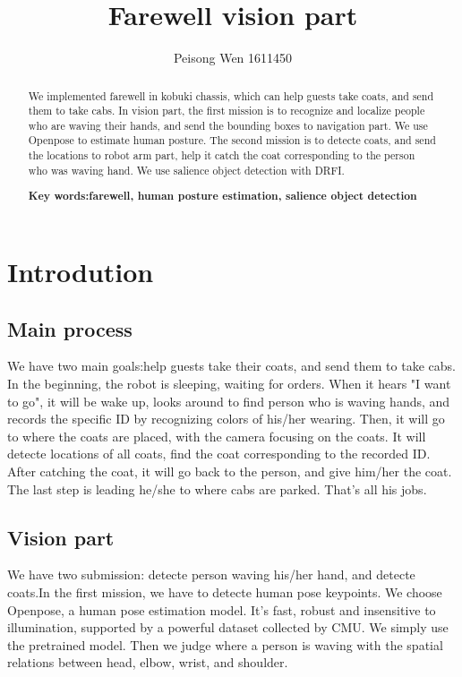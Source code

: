 \documentclass[UTF8]{article}
\begin{document}

\author{Peisong Wen 1611450}
\title {Farewell vision part}
\date{}
\maketitle

\begin{abstract}
  We implemented farewell in kobuki chassis, which can help guests take coats, and send them to take cabs. In vision part, the first mission is to recognize and localize people who are waving their hands, and send the bounding boxes to navigation part. We use Openpose\cite{openpose} to  estimate human posture. The second mission is to detecte coats, and send the locations to robot arm part, help it catch the coat corresponding to the person who was waving hand. We use salience object detection with DRFI\cite{drfi}.
\newline

\textbf{Key words:farewell, human posture estimation, salience object detection}
\end{abstract}

\section{Introdution}
  \subsection{Main process}
    We have two main goals:help guests take their coats, and send them to take cabs. In the beginning, the robot is sleeping, waiting for orders. When it hears "I want to go", it will be wake up, looks around to find person who is waving hands, and records the specific ID by recognizing colors of his/her wearing. Then, it will go to where the coats are placed, with the camera focusing on the coats. It will detecte locations of all coats, find the coat corresponding to the recorded ID. After catching the coat, it will go back to the person, and give him/her the coat. The last step is leading he/she to where cabs are parked. That's all his jobs.
  \subsection{Vision part}
    We have two submission: detecte person waving his/her hand, and detecte coats.In the first mission, we have to detecte human pose keypoints. We choose Openpose, a human pose estimation model. It's fast, robust and insensitive to illumination, supported by a powerful dataset collected by CMU. We simply use the pretrained model. Then we judge where a person is waving with the spatial relations between head, elbow, wrist, and shoulder.
\end{document}
